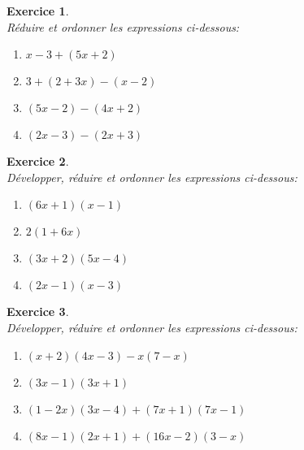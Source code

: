 \documentclass[a4paper,10pt]{article}
\newtheorem{exer}{Exercice}
\begin{document}
\begin{minipage}[t]{1.0\linewidth}
	\begin{minipage}[t]{0.4\linewidth}
		\raggedright
		\begin{exer}\quad\hfill\textbf{}\\
		Réduire et ordonner les expressions ci-dessous:

		\begin{enumerate}
					\item $x - 3 + (5x+2)$

					\item $3 + (2 + 3x)-(x - 2)$
					
					\item $(5x-2) -(4x+2)$
					\item $(2x-3)-(2x+3) $ 

				\end{enumerate}

		

		\end{exer}
		\begin{exer}\quad\hfill\textbf{}\\
		Développer, réduire et ordonner les expressions ci-dessous:

			\begin{enumerate}
				\item $(6x + 1)( x - 1)$
				\item $2(1 + 6x) $
				\item $(3x+2)(5x-4)$
				\item $(2x-1)(x-3)$
			\end{enumerate}

		\end{exer}
		\begin{exer}\quad\hfill\textbf{}\\
				Développer, réduire et ordonner les expressions ci-dessous:

	\begin{enumerate}
						\item $(x+2)(4x-3)-x(7-x)$ 
						
						\item $(3x-1)(3x+1) $
						
						\item $(1-2x)(3x-4)+(7x+1)(7x-1)$
						\item $(8x-1)(2x+1)+(16x-2)(3-x)$
\end{enumerate}


\end{exer}
\end{minipage}
\end{minipage}
\end{document}
